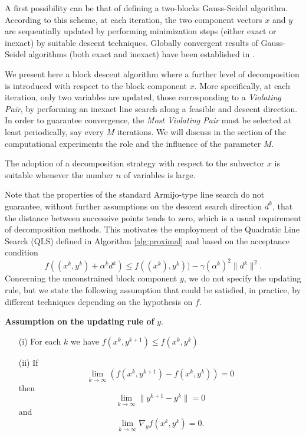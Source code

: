 A first possibility can be that of defining a two-blocks Gauss-Seidel algorithm.
According to this scheme, at each iteration, the two component vectors $x$ and $y$ are
sequentially updated by performing  minimization steps (either exact or inexact) by  suitable descent techniques.
Globally convergent results of Gauss-Seidel algorithms (both exact and inexact) have been established in \cite{gauss-seidel}.

We present here a block descent algorithm where a further level of decomposition is
introduced with respect to the block component $x$. 
More specifically, at each iteration, only two variables are updated, those corresponding
to a {\it Violating Pair}, by performing an inexact line search along a feasible and descent direction.
In order to guarantee convergence, the {\it Most Violating Pair} must be selected at least periodically, say every $M$ iterations.
We will discuss in the section of the computational experiments the role and the influence of the parameter $M$.

The adoption of a decomposition strategy with respect to the subvector $x$ is suitable
whenever the number $n$ of variables is large.

Note that the properties of the standard Armijo-type line search do not guarantee, without further assumptions
on the descent search direction $d^k$, that the distance between successive points tends to zero, which is a usual requirement of decomposition methods. 
This motivates the employment of the Quadratic Line Searck (QLS) defined in Algorithm \ref{alg:proximal} and based on the acceptance condition
$$
f((x^k,y^k)+\alpha^kd^k)\le f((x^k),y^k))-\gamma (\alpha^k)^2\|d^k\|^2.
$$
Concerning the unconstrained block component $y$, we do not specify the updating rule, but we state the following assumption that
could be satisfied, in practice, by different techniques depending on the hypothesis on $f$.
\par\medskip\noindent
{\bf Assumption on the updating rule of} $y$.
\par\medskip\noindent
\begin{itemize}
\item[(i)] For each $k$ we have $f(x^k,y^{k+1})\le f(x^k,y^k)$
\item [(ii)] If
$$
\lim_{k\to\infty} \left(f(x^k,y^{k+1})- f(x^k,y^k)\right)=0
$$
then
$$
\lim_{k\to\infty}\|y^{k+1}-y^k\|=0
$$
and
$$
\lim_{k\to\infty}\nabla_y f(x^k,y^k)=0.
$$
\end{itemize}


